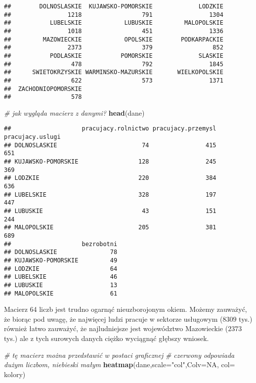 \documentclass[polish,]{book}
\newenvironment{Shaded}{\begin{snugshade}}{\end{snugshade}}
\newcommand{\CommentTok}[1]{\textcolor[rgb]{0.56,0.35,0.01}{\textit{#1}}}
\newcommand{\DataTypeTok}[1]{\textcolor[rgb]{0.13,0.29,0.53}{#1}}
\newcommand{\KeywordTok}[1]{\textcolor[rgb]{0.13,0.29,0.53}{\textbf{#1}}}
\newcommand{\NormalTok}[1]{#1}
\newcommand{\OtherTok}[1]{\textcolor[rgb]{0.56,0.35,0.01}{#1}}
\newcommand{\StringTok}[1]{\textcolor[rgb]{0.31,0.60,0.02}{#1}}
\begin{document}
\begin{verbatim}
##        DOLNOSLASKIE  KUJAWSKO-POMORSKIE             LODZKIE 
##                1218                 791                1304 
##           LUBELSKIE            LUBUSKIE         MALOPOLSKIE 
##                1018                 451                1336 
##         MAZOWIECKIE            OPOLSKIE        PODKARPACKIE 
##                2373                 379                 852 
##           PODLASKIE           POMORSKIE             SLASKIE 
##                 478                 792                1845 
##      SWIETOKRZYSKIE WARMINSKO-MAZURSKIE       WIELKOPOLSKIE 
##                 622                 573                1371 
##  ZACHODNIOPOMORSKIE 
##                 578
\end{verbatim}

\begin{Shaded}
\begin{Highlighting}[]
\CommentTok{# jak wygląda macierz z danymi?}
\KeywordTok{head}\NormalTok{(dane)}
\end{Highlighting}
\end{Shaded}

\begin{verbatim}
##                    pracujacy.rolnictwo pracujacy.przemysl pracujacy.uslugi
## DOLNOSLASKIE                        74                415              651
## KUJAWSKO-POMORSKIE                 128                245              369
## LODZKIE                            220                384              636
## LUBELSKIE                          328                197              447
## LUBUSKIE                            43                151              244
## MALOPOLSKIE                        205                381              689
##                    bezrobotni
## DOLNOSLASKIE               78
## KUJAWSKO-POMORSKIE         49
## LODZKIE                    64
## LUBELSKIE                  46
## LUBUSKIE                   13
## MALOPOLSKIE                61
\end{verbatim}

Macierz 64 liczb jest trudno ogarnąć nieuzborojonym okiem. Możemy zauważyć,
że biorąc pod uwagę, że najwięcej ludzi pracuje w sektorze usługowym (\(8309\) tys.)
również łatwo zauważyć, że najludniejsze jest województwo Mazowieckie (\(2 373\) tys.) ale z tych surowych danych ciężko wyciągnąć głębszy wniosek.

\begin{Shaded}
\begin{Highlighting}[]
\CommentTok{# tę macierz można przedstawić w postaci graficznej}
\CommentTok{# czerwony odpowiada dużym liczbom, niebieski małym}
\KeywordTok{heatmap}\NormalTok{(dane,}\DataTypeTok{scale=}\StringTok{"col"}\NormalTok{,}\DataTypeTok{Colv=}\OtherTok{NA}\NormalTok{, }\DataTypeTok{col=}\NormalTok{ kolory)}
\end{Highlighting}
\end{Shaded}
\end{document}

